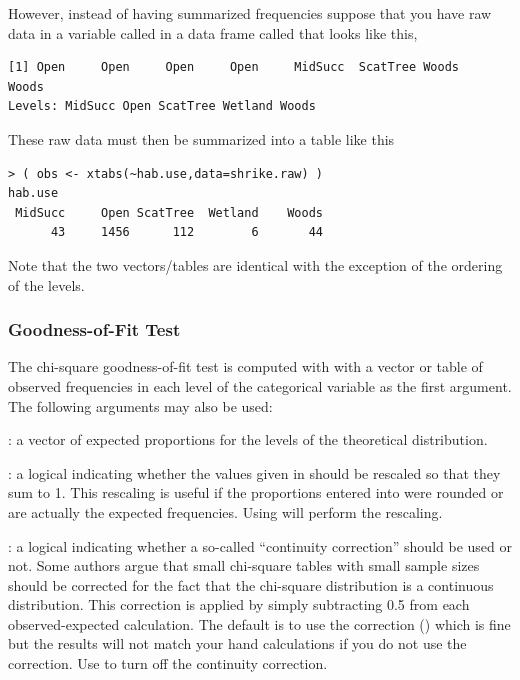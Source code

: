 \documentclass[10pt,openany]{book}\usepackage[]{graphicx}\usepackage[]{color}
\makeatletter
\newenvironment{kframe}{%
 \def\at@end@of@kframe{}%
 \ifinner\ifhmode%
  \def\at@end@of@kframe{\end{minipage}}%
  \begin{minipage}{\columnwidth}%
 \fi\fi%
 \def\FrameCommand##1{\hskip\@totalleftmargin \hskip-\fboxsep
 \colorbox{shadecolor}{##1}\hskip-\fboxsep
     \hskip-\linewidth \hskip-\@totalleftmargin \hskip\columnwidth}%
 \MakeFramed {\advance\hsize-\width
   \@totalleftmargin\z@ \linewidth\hsize
   \@setminipage}}%
 {\par\unskip\endMakeFramed%
 \at@end@of@kframe}
\newenvironment{knitrout}{}{} %
\makeatother
\begin{document}
However, instead of having summarized frequencies suppose that you have raw data in a variable called  in a data frame called  that looks like this,
\begin{knitrout}
\color{fgcolor}\begin{kframe}
\begin{verbatim}
[1] Open     Open     Open     Open     MidSucc  ScatTree Woods    Woods   
Levels: MidSucc Open ScatTree Wetland Woods
\end{verbatim}
\end{kframe}
\end{knitrout}
These raw data must then be summarized into a table like this
\begin{knitrout}
\color{fgcolor}\begin{kframe}
\begin{verbatim}
> ( obs <- xtabs(~hab.use,data=shrike.raw) )
hab.use
 MidSucc     Open ScatTree  Wetland    Woods 
      43     1456      112        6       44 
\end{verbatim}
\end{kframe}
\end{knitrout}
Note that the two vectors/tables are identical with the exception of the ordering of the levels.


\subsubsection{Goodness-of-Fit Test}
The chi-square goodness-of-fit test is computed with  with a vector or table of observed frequencies in each level of the categorical variable as the first argument.  The following arguments may also be used:
\begin{Itemize}
  \item {}: a vector of expected proportions for the levels of the theoretical distribution.
  \item {}: a logical indicating whether the values given in  should be rescaled so that they sum to 1.  This rescaling is useful if the proportions entered into  were rounded or are actually the expected frequencies.  Using  will perform the rescaling.
  \item {}: a logical indicating whether a so-called ``continuity correction'' should be used or not.  Some authors argue that small chi-square tables with small sample sizes should be corrected for the fact that the chi-square distribution is a continuous distribution.  This correction is applied by simply subtracting 0.5 from each observed-expected calculation.  The default is to use the correction () which is fine but the results will not match your hand calculations if you do not use the correction.  Use  to turn off the continuity correction.
\end{Itemize}
\end{document}
